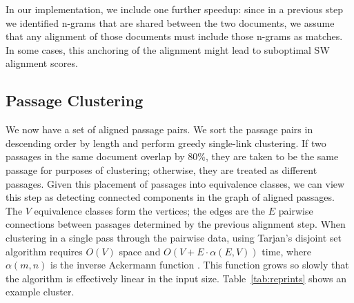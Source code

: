 \documentclass[pdftex,11pt]{article}
\newcommand{\Note}[1]{\textcolor{blue}{\small [#1]}}
\begin{document}
In our implementation, we include one further speedup: since in a
previous step we identified n-grams that are shared between the two
documents, we assume that any alignment of those documents must include
those n-grams as matches.  In some cases, this anchoring of the
alignment might lead to suboptimal SW alignment scores.

\subsection{Passage Clustering}
\label{sec:clustering}

We now have a set of aligned passage pairs.  We sort the passage pairs
in descending order by length and perform greedy single-link
clustering.  If two passages in the same document overlap by 80\%,
they are taken to be the same passage for purposes of clustering;
otherwise, they are treated as different passages.  Given this
placement of passages into equivalence classes, we can view this step
as detecting connected components in the graph of aligned passages.
The $V$ equivalence classes form the vertices; the edges are the $E$
pairwise connections between passages determined by the previous
alignment step.  When clustering in a single pass through the pairwise
data, using Tarjan's disjoint set algorithm requires $O(V)$ space and
$O(V + E \cdot \alpha(E, V))$ time, where $\alpha(m,n)$ is the inverse
Ackermann function \citep{tarjan75:_effic_good_but_not_linear}.  This
function grows so slowly that the algorithm is effectively linear in
the input size.  Table~\ref{tab:reprints} shows an example cluster.

\end{document}
